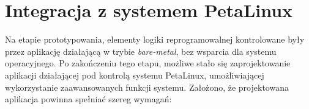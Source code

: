 

\section{Integracja z systemem PetaLinux}

Na etapie prototypowania, elementy logiki reprogramowalnej kontrolowane były przez aplikację działającą w trybie \textit{bare-metal}, bez wsparcia dla systemu operacyjnego.
Po zakończeniu tego etapu, możliwe stało się zaprojektowanie aplikacji działającej pod kontrolą systemu PetaLinux, umożliwiającej wykorzystanie zaawansowanych funkcji systemu.
Założono, że projektowana aplikacja powinna spełniać szereg wymagań:

